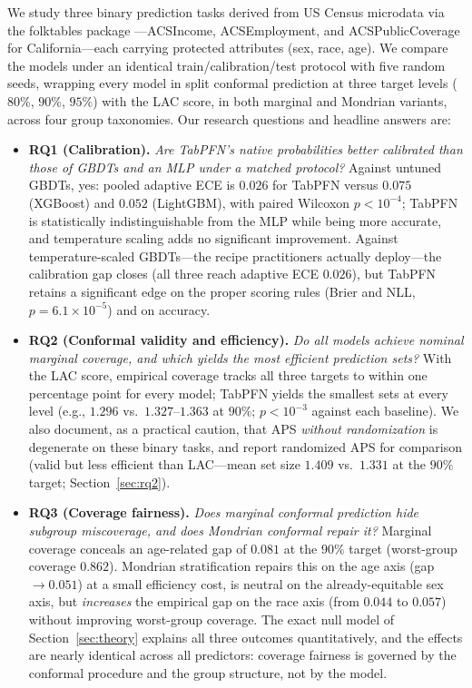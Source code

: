\documentclass[review,12pt]{elsarticle}
\begin{document}
We study three binary prediction tasks derived from US Census microdata via the folktables package \cite{ding2021}---ACSIncome, ACSEmployment, and ACSPublicCoverage for California---each carrying protected attributes (sex, race, age). We compare the models under an identical train/calibration/test protocol with five random seeds, wrapping every model in split conformal prediction at three target levels ($80\%$, $90\%$, $95\%$) with the LAC score, in both marginal and Mondrian variants, across four group taxonomies. Our research questions and headline answers are:

\begin{itemize}
  \item \textbf{RQ1 (Calibration).} \emph{Are TabPFN's native probabilities better calibrated than those of GBDTs and an MLP under a matched protocol?} Against untuned GBDTs, yes: pooled adaptive ECE is $0.026$ for TabPFN versus $0.075$ (XGBoost) and $0.052$ (LightGBM), with paired Wilcoxon $p<10^{-4}$; TabPFN is statistically indistinguishable from the MLP while being more accurate, and temperature scaling adds no significant improvement. Against temperature-scaled GBDTs---the recipe practitioners actually deploy---the calibration gap closes (all three reach adaptive ECE $0.026$), but TabPFN retains a significant edge on the proper scoring rules (Brier and NLL, $p=6.1\times10^{-5}$) and on accuracy.
  \item \textbf{RQ2 (Conformal validity and efficiency).} \emph{Do all models achieve nominal marginal coverage, and which yields the most efficient prediction sets?} With the LAC score, empirical coverage tracks all three targets to within one percentage point for every model; TabPFN yields the smallest sets at every level (e.g., $1.296$ vs.\ $1.327$--$1.363$ at $90\%$; $p<10^{-3}$ against each baseline). We also document, as a practical caution, that APS \emph{without randomization} is degenerate on these binary tasks, and report randomized APS for comparison (valid but less efficient than LAC---mean set size $1.409$ vs.\ $1.331$ at the $90\%$ target; Section~\ref{sec:rq2}).
  \item \textbf{RQ3 (Coverage fairness).} \emph{Does marginal conformal prediction hide subgroup miscoverage, and does Mondrian conformal repair it?} Marginal coverage conceals an age-related gap of $0.081$ at the $90\%$ target (worst-group coverage $0.862$). Mondrian stratification repairs this on the age axis (gap $\to 0.051$) at a small efficiency cost, is neutral on the already-equitable sex axis, but \emph{increases} the empirical gap on the race axis (from $0.044$ to $0.057$) without improving worst-group coverage. The exact null model of Section~\ref{sec:theory} explains all three outcomes quantitatively, and the effects are nearly identical across all predictors: coverage fairness is governed by the conformal procedure and the group structure, not by the model.
\end{itemize}
\end{document}
